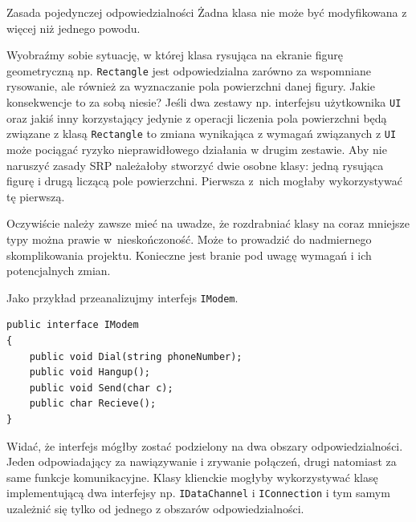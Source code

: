 \begin{myboxWithTitle}{Zasada pojedynczej odpowiedzialności}
	Żadna klasa nie może być modyfikowana z więcej niż jednego powodu.
\end{myboxWithTitle}

Wyobraźmy sobie sytuację, w której klasa rysująca na ekranie figurę geometryczną np. \texttt{Rectangle} jest odpowiedzialna zarówno za wspomniane rysowanie, ale również za wyznaczanie pola powierzchni danej figury. Jakie konsekwencje to za sobą niesie? Jeśli dwa zestawy np. interfejsu użytkownika \texttt{UI} oraz jakiś inny korzystający jedynie z operacji liczenia pola powierzchni będą związane z klasą \texttt{Rectangle} to zmiana wynikająca z wymagań związanych z \texttt{UI} może pociągać ryzyko nieprawidłowego działania w drugim zestawie. Aby nie naruszyć zasady SRP należałoby stworzyć dwie osobne klasy: jedną rysująca figurę i drugą liczącą pole powierzchni. Pierwsza z~nich mogłaby wykorzystywać tę pierwszą. 

Oczywiście należy zawsze mieć na uwadze, że rozdrabniać klasy na coraz mniejsze typy można prawie w~nieskończoność. Może to prowadzić do nadmiernego skomplikowania projektu. Konieczne jest branie pod uwagę wymagań i ich potencjalnych zmian.

Jako przykład przeanalizujmy interfejs \texttt{IModem}.
\begin{lstlisting}[caption={Naruszenie zasady SRP}, label={lab1/lst/srpViolationModem}]
public interface IModem
{
	public void Dial(string phoneNumber);
	public void Hangup();
	public void Send(char c);
	public char Recieve();
}
\end{lstlisting}
Widać, że interfejs mógłby zostać podzielony na dwa obszary odpowiedzialności. Jeden odpowiadający za nawiązywanie i zrywanie połączeń, drugi natomiast za same funkcje komunikacyjne. Klasy klienckie mogłyby wykorzystywać klasę implementującą dwa interfejsy np. \texttt{IDataChannel} i \texttt{IConnection} i tym samym uzależnić się tylko od jednego z obszarów odpowiedzialności. 

